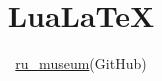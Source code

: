 \documentclass[a5j,10pt]{ltjarticle}
\title{\huge{Lua\LaTeX{}}\\ \subTitle \vspace{80mm}}
\author{ \href{https://github.com/ru-museum/}{ru\_museum}(GitHub)}
\begin{document}
\begin{titlepage}

  \maketitle
		
\end{titlepage}
\end{document}
